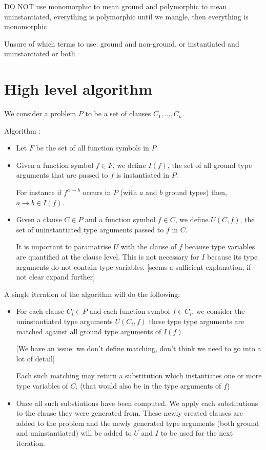 \documentclass{article}
\begin{document}
DO NOT use monomorphic to mean ground and polymorphic to mean uninstantiated, everything is polymorphic until we mangle, then everything is monomorphic

Unsure of which terms to use: ground and non-ground, or instantiated and uninstantiated or both


\section{High level algorithm}

We consider a problem \(P\) to be a set of clauses \(C_1, \dots, C_n\).

Algorithm :
\begin{itemize}
    \item Let \(F\) be the set of all function symbols in \(P\).
    \item Given a function symbol \(f \in F\), we define \(I(f)\), the set of all ground type arguments that are passed to \(f\) is instantiated in \(P\).

    For instance if \(f^{a \rightarrow b}\) occurs in \(P\) (with \(a\) and \(b\) ground types) then, \(a \rightarrow b \in I(f) \).
 \item Given a clause \(C \in P\) and a function symbol \(f \in C\), we define \(U(C, f)\), the set of uninstantiated type arguments passed to \(f\) in \(C\). 

    It is important to paramatrise \(U\) with the clause of \(f\) because type variables are quantified at the clause level. This is not necessary for \(I\) because its type arguments do not contain type variables. [seems a sufficient explanation, if not clear expand further]

\end{itemize}

A single iteration of the algorithm will do the following:
\begin{itemize}
   \item For each clause \(C_i \in P\) and each function symbol \(f \in C_i\), we consider the uninstantiated type arguments \(U(C_i, f)\) these type type arguments are matched against all ground type arguments of \(I(f)\)

      [We have an issue: we don't define matching, don't think we need to go into a lot of detail]

      Each such matching may return a substitution which instantiates one or more type variables of \(C_i\) (that would also be in the type arguments of \(f\))

   \item Once all such substiutions have been computed. We apply each substitutions to the clause they were generated from. These newly created clauses are added to the problem and the newly generated type arguments (both ground and uninstantiated) will be added to \(U\) and \(I\) to be used for the next iteration.
\end{itemize}
\end{document}
